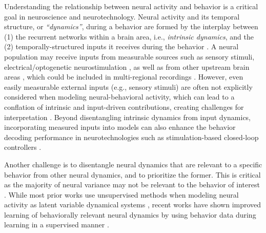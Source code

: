 \documentclass{article} %
\begin{document}
Understanding the relationship between neural activity and behavior is a critical goal in neuroscience and neurotechnology. Neural activity and its temporal structure, or \textit{``dynamics''}, during a behavior are formed by the interplay between (1) the recurrent networks within a brain area, i.e., \textit{intrinsic dynamics}, and the (2) temporally-structured inputs it receives during the behavior \citep{remington2018dynamical, vyas2020computation}. 
A neural population may receive inputs from measurable sources such as sensory stimuli, electrical/optogenetic neurostimulation \citep{buonomano2009state, seely2016tensor, susilaradeya2019extrinsic, sauerbrei2020cortical, shenoy2021measurement,yang2021modelling, vahidi2024modeling}, as well as from other upstream brain areas \citep{sauerbrei2020cortical, shenoy2021measurement}, which could be included in multi-regional recordings \citep{jun2017fully, steinmetz2019distributed}.
However, even easily measurable external inputs (e.g., sensory stimuli) are often not explicitly considered when modeling neural-behavioral activity, which can lead to a conflation of intrinsic and input-driven contributions, creating challenges for interpretation \citep{seely2016tensor, sauerbrei2020cortical, vahidi2024modeling}. Beyond disentangling intrinsic dynamics from input dynamics, incorporating measured inputs into models can also enhance the behavior decoding performance in neurotechnologies such as stimulation-based closed-loop controllers \citep{yang2018control, yang2021modelling}. %

Another challenge is to disentangle neural dynamics that are relevant to a specific behavior from other neural dynamics, and to prioritize the former. This is critical as the majority of neural variance may not be relevant to the behavior of interest \citep{churchland2012neural, mante2013context, kobak2016demixed, allen2019thirst, engel2019new, stringer2019spontaneous, sani2021modeling}. While most prior works use unsupervised methods when modeling neural activity as latent variable dynamical systems \citep{aghagolzadeh2015inference, gao2016linear, wu2017gaussian, pandarinath2018inferring, hernandez2020, rutten2020non, kim2021inferring}, recent works have shown improved learning of behaviorally relevant neural dynamics by using behavior data during learning in a supervised manner \citep{ sani2021modeling,hurwitz2021targeted, kramer2022, gondur2024multi, vahidi2024modeling,abbaspourazad2024dynamical, sani2024dissociative,oganesian2025spectral}.
\end{document}
